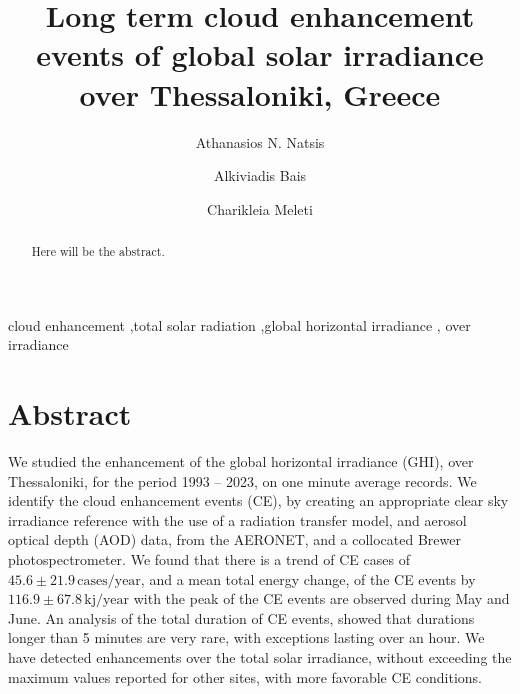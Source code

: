 \documentclass[preprint, 5p,
authoryear]{elsarticle} %
\begin{document}
\begin{frontmatter}

  \title{Long term cloud enhancement events of global solar irradiance
over Thessaloniki, Greece}
    \author[LAP]{Athanasios N. Natsis%
  }
    \author[LAP]{Alkiviadis Bais%
  }
    \author[LAP]{Charikleia Meleti%
  }
  
  \begin{abstract}
  Here will be the abstract.
  \end{abstract}
    \begin{keyword}
    cloud enhancement \sep total solar radiation \sep global horizontal
irradiance \sep 
    over irradiance
  \end{keyword}
  
 \end{frontmatter}

\hypertarget{abstract}{%
\section*{Abstract}\label{abstract}}

We studied the enhancement of the global horizontal irradiance (GHI),
over Thessaloniki, for the period 1993 -- 2023, on one minute average
records. We identify the cloud enhancement events (CE), by creating an
appropriate clear sky irradiance reference with the use of a radiation
transfer model, and aerosol optical depth (AOD) data, from the AERONET,
and a collocated Brewer photospectrometer. We found that there is a
trend of CE cases of \(45.6\pm 21.9\,\text{cases}/\text{year}\), and a
mean total energy change, of the CE events by
\(116.9\pm 67.8\,\text{kj}/\text{year}\) with the peak of the CE events
are observed during May and June. An analysis of the total duration of
CE events, showed that durations longer than 5 minutes are very rare,
with exceptions lasting over an hour. We have detected enhancements over
the total solar irradiance, without exceeding the maximum values
reported for other sites, with more favorable CE conditions.
\end{document}
